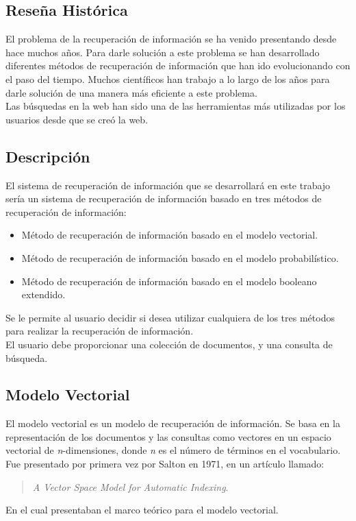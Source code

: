 \documentclass{llncs}
\begin{document}
\subsection{Rese\~na Hist\'orica}
	El problema de la recuperaci\'on de informaci\'on se ha venido presentando desde hace
	muchos a\~nos. Para darle soluci\'on a este problema se han desarrollado diferentes
	m\'etodos de recuperaci\'on de informaci\'on que han ido evolucionando con el paso del
	tiempo. Muchos cient\'ificos han trabajo a lo largo de los a\~nos para darle soluci\'on
	de una manera m\'as eficiente a este problema.\\

	Las b\'usquedas en la web han sido una de las herramientas m\'as utilizadas por los usuarios
	desde que se cre\'o la web.\\

\subsection{Descripci\'on}
	El sistema de recuperaci\'on de informaci\'on que se desarrollar\'a en este trabajo
	ser\'ia un sistema de recuperaci\'on de informaci\'on basado en tres m\'etodos de
	recuperaci\'on de informaci\'on:\\

	\begin{itemize}
		\item M\'etodo de recuperaci\'on de informaci\'on basado en el modelo vectorial.
		\item M\'etodo de recuperaci\'on de informaci\'on basado en el modelo probabil\'istico.
		\item M\'etodo de recuperaci\'on de informaci\'on basado en el modelo booleano extendido.
	\end{itemize}
	
	Se le permite al usuario decidir si desea utilizar cualquiera de los tres m\'etodos
	para realizar la recuperaci\'on de informaci\'on.\\

	El usuario debe proporcionar una colecci\'on de documentos, y una consulta de b\'usqueda.\\

	\subsection{Modelo Vectorial}
	El modelo vectorial es un modelo de recuperaci\'on de informaci\'on. Se basa en la
	representaci\'on de los documentos y las consultas como vectores en un espacio vectorial de 
	\textit{n}-dimensiones, donde \textit{n} es el n\'umero de t\'erminos en el vocabulario. Fue presentado
	por primera vez por Salton en 1971, en un art\'iculo llamado: 
	\begin{quotation}
	    \textit{A Vector Space Model for Automatic Indexing}.
	\end{quotation}
    En el cual presentaban el marco te\'orico para el modelo vectorial.\\
\end{document}
